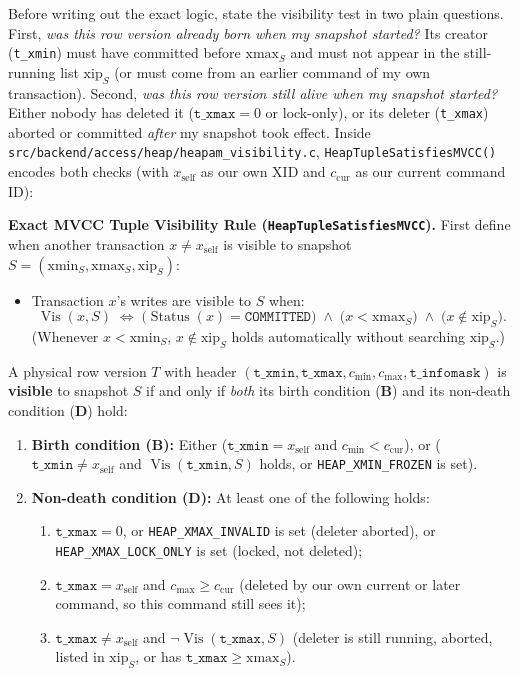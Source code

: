 Before writing out the exact logic, state the visibility test in two plain questions. First, \emph{was this row version already born when my snapshot started?} Its creator (\texttt{t\_xmin}) must have committed before $\mathrm{xmax}_S$ and must not appear in the still-running list $\mathrm{xip}_S$ (or must come from an earlier command of my own transaction). Second, \emph{was this row version still alive when my snapshot started?} Either nobody has deleted it ($\texttt{t\_xmax} = 0$ or lock-only), or its deleter (\texttt{t\_xmax}) aborted or committed \emph{after} my snapshot took effect. Inside \texttt{src/backend/access/heap/heapam\_visibility.c}, \texttt{HeapTupleSatisfiesMVCC()} encodes both checks (with $x_{\text{self}}$ as our own XID and $c_{\text{cur}}$ as our current command ID):

\begin{formalbox}
\textbf{Exact MVCC Tuple Visibility Rule (\texttt{HeapTupleSatisfiesMVCC}).}
First define when another transaction $x \ne x_{\text{self}}$ is visible to snapshot $S = (\mathrm{xmin}_S, \mathrm{xmax}_S, \mathrm{xip}_S)$:
\begin{itemize}
  \item Transaction $x$'s writes are visible to $S$ when:
  \[
    \operatorname{Vis}(x, S) \;\iff\; \big(\operatorname{Status}(x) = \texttt{COMMITTED}\big) \;\land\; \big(x < \mathrm{xmax}_S\big) \;\land\; \big(x \notin \mathrm{xip}_S\big).
  \]
  (Whenever $x < \mathrm{xmin}_S$, $x \notin \mathrm{xip}_S$ holds automatically without searching $\mathrm{xip}_S$.)
\end{itemize}
A physical row version $T$ with header $(\texttt{t\_xmin}, \texttt{t\_xmax}, c_{\min}, c_{\max}, \texttt{t\_infomask})$ is \textbf{visible} to snapshot $S$ if and only if \emph{both} its birth condition (\textbf{B}) and its non-death condition (\textbf{D}) hold:
\begin{enumerate}
  \item \textbf{Birth condition (B):} Either ($\texttt{t\_xmin} = x_{\text{self}}$ and $c_{\min} < c_{\text{cur}}$), or ($\texttt{t\_xmin} \ne x_{\text{self}}$ and $\operatorname{Vis}(\texttt{t\_xmin}, S)$ holds, or \texttt{HEAP\_XMIN\_FROZEN} is set).
  \item \textbf{Non-death condition (D):} At least one of the following holds:
  \begin{enumerate}
    \item $\texttt{t\_xmax} = 0$, or \texttt{HEAP\_XMAX\_INVALID} is set (deleter aborted), or \texttt{HEAP\_XMAX\_LOCK\_ONLY} is set (locked, not deleted);
    \item $\texttt{t\_xmax} = x_{\text{self}}$ and $c_{\max} \ge c_{\text{cur}}$ (deleted by our own current or later command, so this command still sees it);
    \item $\texttt{t\_xmax} \ne x_{\text{self}}$ and $\neg \operatorname{Vis}(\texttt{t\_xmax}, S)$ (deleter is still running, aborted, listed in $\mathrm{xip}_S$, or has $\texttt{t\_xmax} \ge \mathrm{xmax}_S$).
  \end{enumerate}
\end{enumerate}
\end{formalbox}


